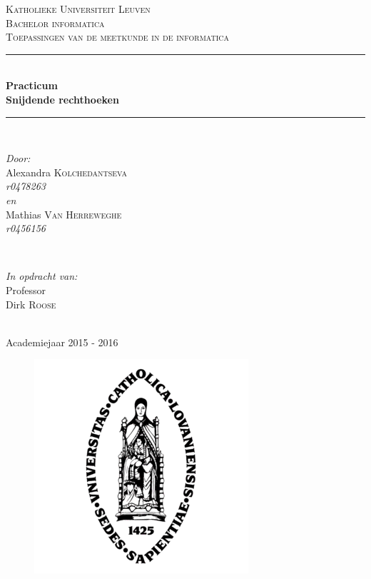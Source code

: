 \documentclass{article}
\begin{document}
\begin{titlepage}
	
	\newcommand{\HRule}{\rule{\linewidth}{0.5mm}}
	
	\center
	
	\textsc{\LARGE Katholieke Universiteit Leuven}\\[1.5cm]
	\textsc{\Large Bachelor informatica}\\[0.5cm]
	\textsc{\large Toepassingen van de meetkunde in de informatica}\\[0.5cm]
	
	\HRule \\[0.4cm]
	{ \huge \bfseries Practicum\\ Snijdende rechthoeken }\\[0.4cm]
	\HRule \\[1.5cm]
	\begin{minipage}
		{0.4
		\textwidth} 
		\begin{flushleft}
		    \large \emph{Door:}\\
			Alexandra \textsc{Kolchedantseva} \\
			\emph{r0478263}\\
			\large \emph{en}\\
			Mathias \textsc{Van Herreweghe} \\
			\emph{r0456156}
		\end{flushleft}
	\end{minipage}
	~ 
	\begin{minipage}
		{0.4
		\textwidth} 
		\begin{flushright}
			\large \emph{In opdracht van:} \\
			Professor \\
			Dirk \textsc{Roose} 
		\end{flushright}
	\end{minipage}
	\\[4cm]
	
	{\large Academiejaar 2015 - 2016}\\
	\begin{figure}
		[b] \centering 
		\includegraphics[scale = 0.2]{kul.png} 
	\end{figure}
\end{titlepage}
\end{document}
